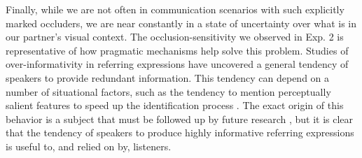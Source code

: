 \documentclass[manuscript]{stjour}
\begin{document}
Finally, while we are not often in communication scenarios with such explicitly marked occluders, we are near constantly in a state of uncertainty over what is in our partner's visual context. The occlusion-sensitivity we observed in Exp. 2 is representative of how pragmatic mechanisms help solve this problem.
Studies of over-informativity in referring expressions have uncovered a general tendency of speakers to provide redundant information.
This tendency can depend on a number of situational factors, such as the tendency to mention perceptually salient features to speed up the identification process  \cite{KoolenGattGoudbeekKrahmer11_Overspecification}. 
The exact origin of this behavior is a subject that must be followed up by future research \cite[e.g.]{GannBarr14_AudienceDesign}, but it is clear that the tendency of speakers to produce highly informative referring expressions is useful to, and relied on by, listeners. 

\end{document}
